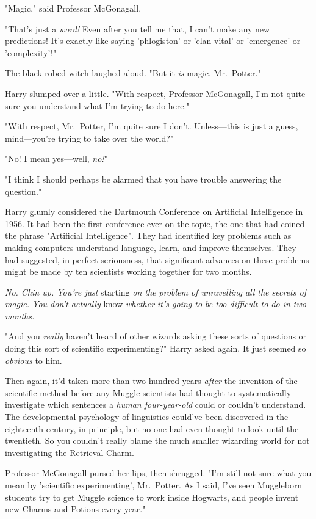 "Magic," said Professor McGonagall.

"That's just a \emph{word!} Even after you tell me that, I can't make any new 
predictions! It's exactly like saying 'phlogiston' or 'elan vital' or 
'emergence' or 'complexity'!"

The black-robed witch laughed aloud. "But it \emph{is} magic, Mr.~Potter."

Harry slumped over a little. "With respect, Professor McGonagall, I'm not quite 
sure you understand what I'm trying to do here."

"With respect, Mr.~Potter, I'm quite sure I don't. Unless---this is just a 
guess, mind---you're trying to take over the world?"

"No! I mean yes---well, \emph{no!}"

"I think I should perhaps be alarmed that you have trouble answering the 
question."

Harry glumly considered the Dartmouth Conference on Artificial Intelligence in 
1956. It had been the first conference ever on the topic, the one that had 
coined the phrase "Artificial Intelligence". They had identified key problems 
such as making computers understand language, learn, and improve themselves. 
They had suggested, in perfect seriousness, that significant advances on these 
problems might be made by ten scientists working together for two months.

\emph{No. Chin up. You're just} starting\emph{ on the problem of unravelling 
all the secrets of magic. You don't actually} know\emph{ whether it's going to 
be too difficult to do in two months.}

"And you \emph{really} haven't heard of other wizards asking these sorts of 
questions or doing this sort of scientific experimenting?" Harry asked again. 
It just seemed so \emph{obvious} to him.

Then again, it'd taken more than two hundred years \emph{after} the invention 
of the scientific method before any Muggle scientists had thought to 
systematically investigate which sentences a \emph{human four-year-old} could 
or couldn't understand. The developmental psychology of linguistics could've 
been discovered in the eighteenth century, in principle, but no one had even 
thought to look until the twentieth. So you couldn't really blame the much 
smaller wizarding world for not investigating the Retrieval Charm.

Professor McGonagall pursed her lips, then shrugged. "I'm still not sure what 
you mean by 'scientific experimenting', Mr.~Potter. As I said, I've seen 
Muggleborn students try to get Muggle science to work inside Hogwarts, and 
people invent new Charms and Potions every year."

